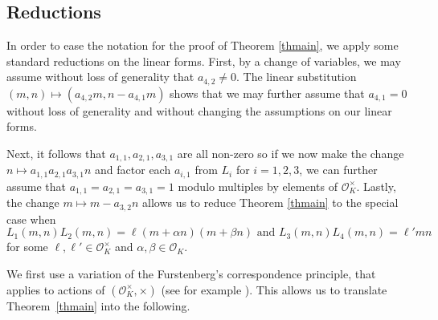 \documentclass[11pt]{amsart}
\theoremstyle{definition}
\newcommand{\WS}[1]{{\color{blue}{{#1}}}}
\begin{document}
\subsection{Reductions}




 


 
In order to ease the notation for the proof of Theorem \ref{thmain}, we apply some standard reductions on the linear forms. First, by a change of variables, we may assume without loss of generality that $a_{4,2} \neq 0$.  The linear substitution $(m,n) \mapsto (a_{4,2}m,n-a_{4,1}m)$ shows that we may further assume that $a_{4,1}=0$ without loss of generality and without changing the assumptions on our linear forms. 

Next, it follows that $a_{1,1},a_{2,1},a_{3,1}$ are all non-zero so if we now make the change $n \mapsto a_{1,1}a_{2,1}a_{3,1} n$ and factor each $a_{i,1}$ from $L_i$ for $i=1,2,3$, we can further assume that $a_{1,1}=a_{2,1}=a_{3,1}=1$ modulo multiples by elements of $\mathcal{O}_K^{\times}$. Lastly, the change $m \mapsto m-a_{3,2}n$ allows us to reduce Theorem \ref{thmain} to the special case when
$$L_{1}(m,n)L_{2}(m,n)=\ell(m+\alpha n)(m+\beta n) \text{ and } L_{3}(m,n)L_{4}(m,n)=\ell'mn$$
for some $\ell, \ell' \in \mathcal{O}_K^{\times}$ and $\alpha,\beta \in \mathcal{O}_K$.


We first use a variation of the Furstenberg's correspondence principle, that applies to actions of $(\mathcal{O}_K^{\times}, \times)$ (see for example \cite[Theorem~2.8]{bf21b}). This allows us to translate Theorem~\ref{thmain} into the following.
\end{document}
